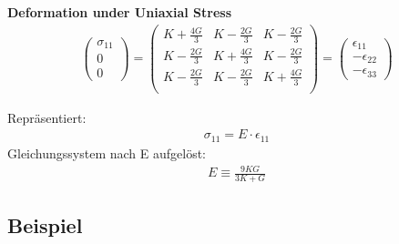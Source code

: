 \documentclass[a4paper, 10pt]{scrartcl}
\begin{document}
\textbf{Deformation under Uniaxial Stress}\\
\begin{align}
	\begin{pmatrix}
		\sigma_{11}\\
		0\\
		0
	\end{pmatrix} = 
	\begin{pmatrix}
		K + \frac{4G}{3} & K - \frac{2G}{3} & K - \frac{2G}{3}\\
		K - \frac{2G}{3} & K + \frac{4G}{3} & K - \frac{2G}{3}\\
		K - \frac{2G}{3} & K - \frac{2G}{3} & K + \frac{4G}{3}\\
	\end{pmatrix} =
	\begin{pmatrix}
		\epsilon_{11}\\
		- \epsilon_{22}\\
		- \epsilon_{33}
	\end{pmatrix}
\end{align}

Repräsentiert:
\begin{align}
	\sigma_{11} = E \cdot \epsilon_{11}
\end{align}
Gleichungssystem nach E aufgelöst:
\begin{align}
	E \equiv \frac{9 K G}{3K + G}
\end{align}


\subsection{Beispiel}
\end{document}
